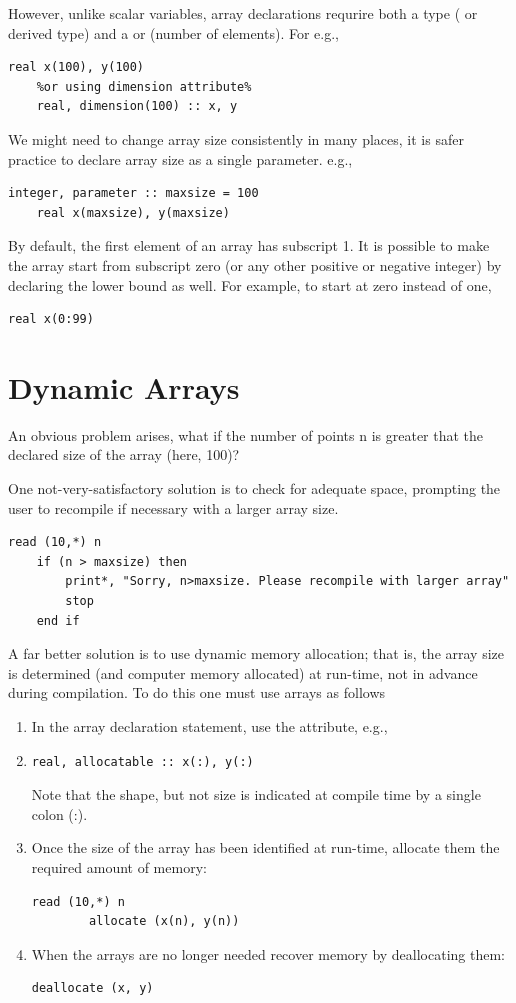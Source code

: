 \documentclass[class=book,crop=false]{standalone}
\begin{document}
However, unlike scalar variables, array declarations requrire both a type ( or derived type) and a  or  (number of elements). For e.g.,
\begin{lstlisting}[numbers=none,escapechar=\%]
    real x(100), y(100)
    %or using dimension attribute%
    real, dimension(100) :: x, y
\end{lstlisting}
We might need to change array size consistently in many places, it is safer practice to declare array size as a single parameter. e.g.,
\begin{lstlisting}[numbers=none]
    integer, parameter :: maxsize = 100
    real x(maxsize), y(maxsize)
\end{lstlisting}
By default, the first element of an array has subscript 1. It is possible to make the array start from subscript zero (or any other positive or negative integer) by declaring the lower bound as well. For example, to start at zero instead of one,
\begin{lstlisting}[numbers=none]
    real x(0:99)
\end{lstlisting}
\section{Dynamic Arrays}
An obvious problem arises, what if the number of points n is greater that the declared size of the array (here, 100)?

One not-very-satisfactory solution is to check for adequate space, prompting the user to recompile if necessary with a larger array size.
\begin{lstlisting}[numbers=none]
    read (10,*) n
    if (n > maxsize) then
        print*, "Sorry, n>maxsize. Please recompile with larger array"
        stop
    end if
\end{lstlisting}
A far better solution is to use dynamic memory allocation; that is, the array size is determined (and computer memory allocated) at run-time, not in advance during compilation. To do this one must use  arrays as follows\begin{enumerate}
    \item In the array declaration statement, use the  attribute, e.g.,
    \item \begin{lstlisting}[numbers=none]
        real, allocatable :: x(:), y(:)
    \end{lstlisting}
    Note that the shape, but not size is indicated at compile time by a single colon (:).
    \item Once the size of the array has been identified at run-time, allocate them the required amount of memory:
    \begin{lstlisting}[numbers=none]
        read (10,*) n
        allocate (x(n), y(n))
    \end{lstlisting}
    \item When the arrays are no longer needed recover memory by deallocating them:
    \begin{lstlisting}[numbers=none]
        deallocate (x, y)
    \end{lstlisting}
\end{enumerate}
\end{document}
